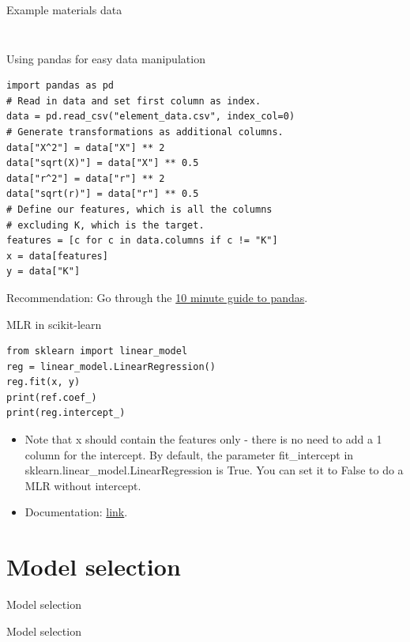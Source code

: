 \documentclass[aspectratio=169]{beamer}
\begin{document}
\begin{frame}{Example materials data}
\begin{columns}
\begin{column}{0.4\textwidth}
\begin{figure}
    \end{figure}
    \end{column}
\end{columns}
\end{frame} 


\begin{frame}[fragile]{Using pandas for easy data manipulation}
    \begin{verbatim}
import pandas as pd
# Read in data and set first column as index.
data = pd.read_csv("element_data.csv", index_col=0)
# Generate transformations as additional columns.
data["X^2"] = data["X"] ** 2
data["sqrt(X)"] = data["X"] ** 0.5
data["r^2"] = data["r"] ** 2
data["sqrt(r)"] = data["r"] ** 0.5
# Define our features, which is all the columns
# excluding K, which is the target.
features = [c for c in data.columns if c != "K"]
x = data[features]
y = data["K"]
\end{verbatim}

Recommendation: Go through the \href{https://pandas.pydata.org/pandas-docs/stable/getting_started/10min.html}{10 minute guide to pandas}.
\end{frame} 


\begin{frame}[fragile]{MLR in scikit-learn}
\begin{verbatim}
from sklearn import linear_model
reg = linear_model.LinearRegression()
reg.fit(x, y)
print(ref.coef_)
print(reg.intercept_)
\end{verbatim}

\begin{itemize}
    \item Note that x should contain the features only - there is no need to add a 1 column for the intercept. By default, the parameter fit\_intercept in sklearn.linear\_model.LinearRegression is True. You can set it to False to do a MLR without intercept.
    \item Documentation: \href{https://scikit-learn.org/stable/modules/generated/sklearn.linear_model.LinearRegression.html}{link}.
\end{itemize}

\end{frame} 


\section{Model selection}

\begin{frame}{Model selection}
    \Huge{\centerline{Model selection}}
\end{frame} 
\end{document}
